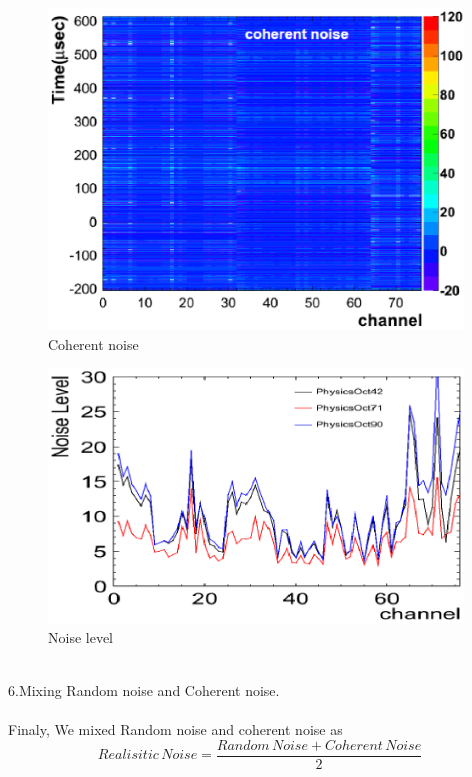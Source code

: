 \begin{figure}[!htb]
  \centering
  \centering
  \includegraphics[width=11cm,clip]{./fig/coherentNoise.eps}
  \caption{Coherent noise}
  \label{coherentNoise}
\end{figure}
\begin{figure}[!htb]
  \centering
  \centering
  \includegraphics[width=11cm,clip]{./fig/scaling.eps}
  \caption{Noise level}
  \label{scaling}
\end{figure}
\\
6.Mixing Random noise and Coherent noise.\\
\\
Finaly, We mixed Random noise and coherent noise as \\
\begin{equation}
  Realisitic\,Noise = \frac{Random\,Noise + Coherent\,Noise}{2}
\end{equation}
